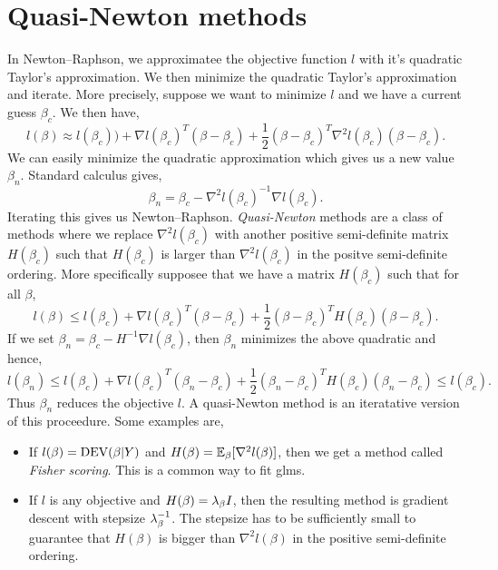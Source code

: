 \section{Quasi-Newton methods}
In Newton--Raphson, we approximatee the objective function $l$ with it's quadratic Taylor's approximation. We then minimize the quadratic Taylor's approximation and iterate. More precisely, suppose we want  to minimize $l$ and we have a  current  guess $\beta_c$. We then  have,
\[l(\beta) \approx l(\beta_c))+\nabla l(\beta_c)^T(\beta-\beta_c)+\frac{1}{2}(\beta-\beta_c)^T\nabla^2 l(\beta_c)(\beta-\beta_c). \]
We can  easily minimize the  quadratic approximation  which gives us a new value $\beta_n$. Standard calculus gives,
\[\beta_n = \beta_c - \nabla^2l(\beta_c)^{-1}\nabla l(\beta_c). \]
Iterating this gives us Newton--Raphson. \emph{Quasi-Newton} methods are a class of methods where we replace $\nabla^2l(\beta_c)$  with another positive semi-definite matrix $H(\beta_c)$ such that $H(\beta_c)$ is larger than $\nabla^2 l(\beta_c)$ in the positve semi-definite ordering. More specifically supposee that we have a matrix $H(\beta_c)$ such that for all $\beta$,
\[l(\beta) \le l(\beta_c)+\nabla l(\beta_c)^T(\beta-\beta_c)+\frac{1}{2}(\beta-\beta_c)^TH(\beta_c)(\beta-\beta_c). \]
If we set $\beta_n = \beta_c-H^{-1}\nabla l(\beta_c)$, then $\beta_n$ minimizes the above quadratic and hence,
\[l(\beta_n) \le l(\beta_c)+\nabla l(\beta_c)^T(\beta_n-\beta_c)+\frac{1}{2}(\beta_n-\beta_c)^TH(\beta_c)(\beta_n-\beta_c) \le   l(\beta_c). \]
Thus $\beta_n$ reduces the objective  $l$. A quasi-Newton method is an iteratative   version of this proceedure. Some examples are,
\begin{itemize}
    \item If $l(\beta)=\operatorname{DEV}(\beta|Y)$ and $H(\beta) = {\mathbb{E}}_\beta[\nabla^2 l(\beta)]$, then we get a method called \emph{Fisher scoring}. This is a common way to fit glms.
    \item If $l$ is any objective and $H(\beta) = \lambda_\beta I$, then the resulting method is gradient descent with stepsize $\lambda_\beta^{-1}$. The stepsize has to be sufficiently small to guarantee that $H(\beta)$ is bigger than $\nabla^2 l(\beta)$ in the positive semi-definite ordering.
\end{itemize}


